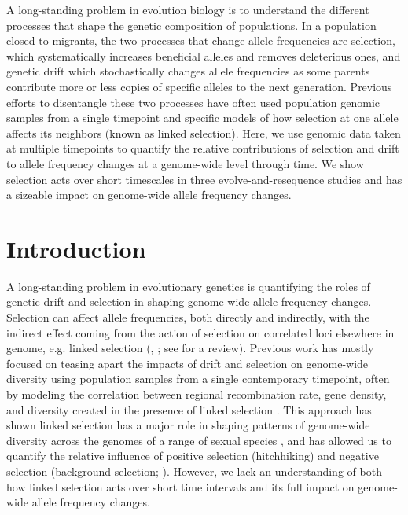 \documentclass[11pt]{article}
\begin{document}
A long-standing problem in evolution biology is to understand the different
processes that shape the genetic composition of populations. In a population
closed to migrants, the two processes that change allele frequencies are
selection, which systematically increases beneficial alleles and removes
deleterious ones, and genetic drift which stochastically changes allele
frequencies as some parents contribute more or less copies of specific
alleles to the next generation. Previous efforts to disentangle these two
processes have often used population genomic samples from a single timepoint
and specific models of how selection at one allele affects its neighbors (known
as linked selection). Here, we use genomic data taken at multiple timepoints
to quantify the relative contributions of selection and drift to allele
frequency changes at a genome-wide level through time. We show selection acts
over short timescales in three evolve-and-resequence studies and has a sizeable
impact on genome-wide allele frequency changes. 




\section{Introduction}

A long-standing problem in evolutionary genetics is quantifying the roles of
genetic drift and selection in shaping genome-wide allele frequency changes.
Selection can affect allele frequencies, both directly and indirectly, with the
indirect effect coming from the action of selection on correlated loci
elsewhere in genome, e.g. linked selection (\cite{Maynard_Smith1974-lc},
\cite{Charlesworth1993-gb,Nordborg1996-nq}; see \cite{Barton2000-zg} for a
review). Previous work has mostly focused on teasing apart the impacts of drift
and selection on genome-wide diversity using population samples from a single
contemporary timepoint, often by modeling the correlation between regional
recombination rate, gene density, and diversity created in the presence of
linked selection \parencite{Cutter2013-ba,Sella2009-nx}. This approach has
shown linked selection has a major role in shaping patterns of genome-wide
diversity across the genomes of a range of sexual species
\parencite{Macpherson2007-qt,Andolfatto2007-uy,Begun2007-bg,Beissinger2016-cm,Sattath2011-dr,Williamson2014-oy,Andersen2012-bj,Cutter2010-gi,Elyashiv2016-vt},
and has allowed us to quantify the relative influence of positive selection
(hitchhiking) and negative selection (background selection;
\cite{Nordborg2005-dc,McVicker2009-ax,Andolfatto2007-uy,Macpherson2007-qt,Hernandez2011-gs,Elyashiv2016-vt}).
However, we lack an understanding of both how linked selection acts over short
time intervals and its full impact on genome-wide allele frequency changes.
\end{document}
